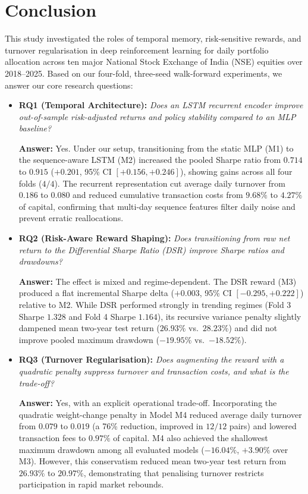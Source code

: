 \chapter{Conclusion}
\label{ch:conclusion}

This study investigated the roles of temporal memory, risk-sensitive rewards, and turnover regularisation in deep reinforcement learning for daily portfolio allocation across ten major National Stock Exchange of India (NSE) equities over 2018--2025. Based on our four-fold, three-seed walk-forward experiments, we answer our core research questions:

\begin{itemize}
    \setlength{\itemsep}{1pt}
    \item \textbf{RQ1 (Temporal Architecture):} \textit{Does an LSTM recurrent encoder improve out-of-sample risk-adjusted returns and policy stability compared to an MLP baseline?}
    
    \textbf{Answer:} Yes. Under our setup, transitioning from the static MLP (M1) to the sequence-aware LSTM (M2) increased the pooled Sharpe ratio from $0.714$ to $0.915$ ($+0.201$, 95\% CI $[+0.156, +0.246]$), showing gains across all four folds ($4/4$). The recurrent representation cut average daily turnover from $0.186$ to $0.080$ and reduced cumulative transaction costs from $9.68\%$ to $4.27\%$ of capital, confirming that multi-day sequence features filter daily noise and prevent erratic reallocations.

    \item \textbf{RQ2 (Risk-Aware Reward Shaping):} \textit{Does transitioning from raw net return to the Differential Sharpe Ratio (DSR) improve Sharpe ratios and drawdowns?}
    
    \textbf{Answer:} The effect is mixed and regime-dependent. The DSR reward (M3) produced a flat incremental Sharpe delta ($+0.003$, 95\% CI $[-0.295, +0.222]$) relative to M2. While DSR performed strongly in trending regimes (Fold 3 Sharpe $1.328$ and Fold 4 Sharpe $1.164$), its recursive variance penalty slightly dampened mean two-year test return ($26.93\%$ vs.\ $28.23\%$) and did not improve pooled maximum drawdown ($-19.95\%$ vs.\ $-18.52\%$).

    \item \textbf{RQ3 (Turnover Regularisation):} \textit{Does augmenting the reward with a quadratic penalty suppress turnover and transaction costs, and what is the trade-off?}
    
    \textbf{Answer:} Yes, with an explicit operational trade-off. Incorporating the quadratic weight-change penalty in Model M4 reduced average daily turnover from $0.079$ to $0.019$ (a 76\% reduction, improved in $12/12$ pairs) and lowered transaction fees to $0.97\%$ of capital. M4 also achieved the shallowest maximum drawdown among all evaluated models ($-16.04\%$, $+3.90\%$ over M3). However, this conservatism reduced mean two-year test return from $26.93\%$ to $20.97\%$, demonstrating that penalising turnover restricts participation in rapid market rebounds.


\end{itemize}
